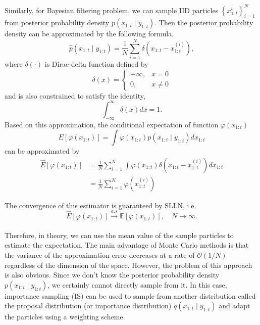 \documentclass[mstat,12pt]{unswthesis}  %
\newcommand{\E}{\mathbb{E}}
\numberwithin{equation}{section}
\begin{document}
\noindent Similarly, for Bayesian filtering problem, we can sample 
IID particles $\left\{x_{1:t}^{i}\right\}_{i=1}^{N}$
from  posterior probability density $p\left(x_{1:t} \mid y_{1:t}\right)$.
Then the posterior probability density can be approximated by the following formula,
\begin{equation}\hat{p}\left(x_{1:t} \mid y_{1:t}\right)=\frac{1}{N} \sum_{i=1}^{N} \delta\left(x_{1:t}-x_{1:t}^{\left(i\right)}\right),\end{equation}
where $\delta(\cdot)$ is Dirac-delta function defined by
\begin{equation}\delta(x)=\left\{\begin{array}{ll}
+\infty, & x=0 \\
0, & x \neq 0
\end{array}\right.\end{equation}
and is also constrained to satisfy the identity,
\begin{equation}\int_{-\infty}^{\infty} \delta(x) d x=1.\end{equation}
Based on this approximation, the conditional expectation of function $\varphi(x_{1:t})$ 
\begin{equation}E\left[\varphi\left(x_{1:t}\right)\right]=\int \varphi\left(x_{1:t}\right) p\left(x_{1:t} \mid y_{1:t}\right) d x_{1:t}\end{equation}
can be approximated by
\begin{equation}\begin{aligned}
\hat{E}\left[\varphi\left(x_{1:t}\right)\right] &=\frac{1}{N} \sum_{i=1}^{N} \int \varphi\left(x_{1:t}\right) \delta\left(x_{1:t}-x_{1:t}^{\left(i\right)}\right) d x_{1:t} \\
&=\frac{1}{N} \sum_{i=1}^{N} \varphi\left(x_{1:t}^{\left(i\right)}\right)
\end{aligned}\end{equation}

\noindent The convergence of this estimator is guaranteed by
SLLN, i.e.
\begin{equation}
\hat{E}\left[\varphi\left(x_{1:t}\right)\right] \stackrel{a . s}{\longrightarrow} \E\left[\varphi\left(x_{1:t}\right)\right], \quad N \rightarrow \infty.\end{equation}\\

\noindent Therefore, in theory, we can use the mean value of the sample particles to estimate the expectation.
The main advantage of Monte Carlo methods  is that the variance of
the approximation error decreases at a rate of
$\mathcal{O}(1 / N)$ regardless of the dimension of the space. However, the problem of this approach is also obvious.
Since we don’t know the posterior probability density
$p\left(x_{1:t} \mid y_{1:t}\right)$, we certainly cannot
directly sample from it.
In this case, importance
sampling (IS) \cite{marshall1954use} can be used to sample from another distribution
called the proposal distribution (or importance distribution) $q\left(x_{1:t} \mid y_{1:t}\right)$ and adapt the
particles using a weighting scheme.\\
\end{document}
